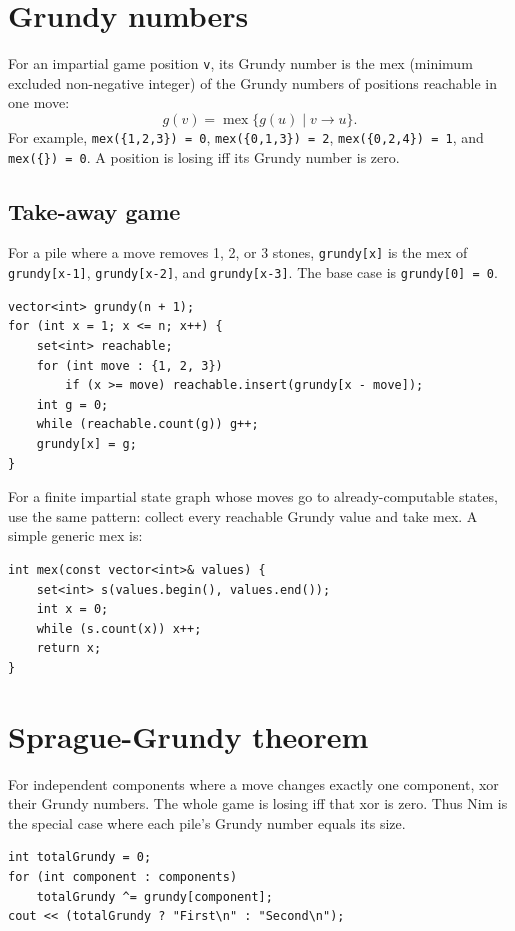 \section{Grundy numbers}

For an impartial game position \texttt{v}, its Grundy number is the mex (minimum excluded non-negative integer) of the Grundy numbers of positions reachable in one move:
\[
g(v) = \operatorname{mex}\{g(u) \mid v \to u\}.
\]
For example, \texttt{mex(\{1,2,3\}) = 0}, \texttt{mex(\{0,1,3\}) = 2}, \texttt{mex(\{0,2,4\}) = 1}, and \texttt{mex(\{\}) = 0}. A position is losing iff its Grundy number is zero.

\subsection{Take-away game}

For a pile where a move removes 1, 2, or 3 stones, \texttt{grundy[x]} is the mex of \texttt{grundy[x-1]}, \texttt{grundy[x-2]}, and \texttt{grundy[x-3]}. The base case is \texttt{grundy[0] = 0}.

\begin{lstlisting}
vector<int> grundy(n + 1);
for (int x = 1; x <= n; x++) {
    set<int> reachable;
    for (int move : {1, 2, 3})
        if (x >= move) reachable.insert(grundy[x - move]);
    int g = 0;
    while (reachable.count(g)) g++;
    grundy[x] = g;
}
\end{lstlisting}

For a finite impartial state graph whose moves go to already-computable states, use the same pattern: collect every reachable Grundy value and take mex. A simple generic mex is:

\begin{lstlisting}
int mex(const vector<int>& values) {
    set<int> s(values.begin(), values.end());
    int x = 0;
    while (s.count(x)) x++;
    return x;
}
\end{lstlisting}

\section{Sprague-Grundy theorem}

For independent components where a move changes exactly one component, xor their Grundy numbers. The whole game is losing iff that xor is zero. Thus Nim is the special case where each pile's Grundy number equals its size.

\begin{lstlisting}
int totalGrundy = 0;
for (int component : components)
    totalGrundy ^= grundy[component];
cout << (totalGrundy ? "First\n" : "Second\n");
\end{lstlisting}

